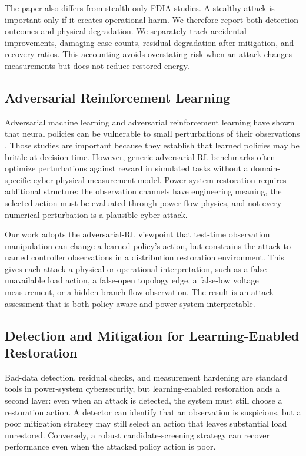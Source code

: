 The paper also differs from stealth-only FDIA studies. A stealthy attack is important only if it creates operational harm. We therefore report both detection outcomes and physical degradation. We separately track accidental improvements, damaging-case counts, residual degradation after mitigation, and recovery ratios. This accounting avoids overstating risk when an attack changes measurements but does not reduce restored energy.

\subsection{Adversarial Reinforcement Learning}

Adversarial machine learning and adversarial reinforcement learning have shown that neural policies can be vulnerable to small perturbations of their observations \cite{huang2017adversarialPolicies,zhang2020robustDRL}. Those studies are important because they establish that learned policies may be brittle at decision time. However, generic adversarial-RL benchmarks often optimize perturbations against reward in simulated tasks without a domain-specific cyber-physical measurement model. Power-system restoration requires additional structure: the observation channels have engineering meaning, the selected action must be evaluated through power-flow physics, and not every numerical perturbation is a plausible cyber attack.

Our work adopts the adversarial-RL viewpoint that test-time observation manipulation can change a learned policy's action, but constrains the attack to named controller observations in a distribution restoration environment. This gives each attack a physical or operational interpretation, such as a false-unavailable load action, a false-open topology edge, a false-low voltage measurement, or a hidden branch-flow observation. The result is an attack assessment that is both policy-aware and power-system interpretable.

\subsection{Detection and Mitigation for Learning-Enabled Restoration}

Bad-data detection, residual checks, and measurement hardening are standard tools in power-system cybersecurity, but learning-enabled restoration adds a second layer: even when an attack is detected, the system must still choose a restoration action. A detector can identify that an observation is suspicious, but a poor mitigation strategy may still select an action that leaves substantial load unrestored. Conversely, a robust candidate-screening strategy can recover performance even when the attacked policy action is poor.


